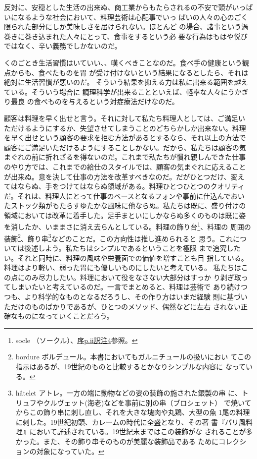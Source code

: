 反対に、安穏とした生活の出来ぬ、商工業からもたらされるの不安で頭がいっぱいになるような社会において、料理芸術は心配事でいっ
ぱいの人々の心のごく限られた部分にしか美味しさを届けられない。ほとんど
の場合、諸事という渦巻きに巻き込まれた人々にとって、食事をするという必
要な行為はもはや悦びではなく、辛い義務でしかないのだ。

くのごとき生活習慣はいていい、、嘆くべきことなのだ。食べ手の健康という観点からも、食べたものを胃
が受け付けないという結果になるとしたら、それは絶対に生活習慣が悪いのだ。
そういう結果を抑える力は私に出来る範囲を越えている。そういう場合に
調理科学が出来ることといえば、軽率な人々にうかぎり最良
の食べものを与えるという対症療法だけなのだ。

顧客は料理を早く出せと言う。それに対して私たち料理人としては、ご満足い
ただけるようにするか、失望させてしまうことのどちらかしか出来ない。料理
を早く出せという顧客の要求を拒む方法があるとするなら、それ以上の方法で
顧客にご満足いただけるようにすることしかない。だから、私たちは顧客の気
まぐれの前に折れざるを得ないのだ。これまで私たちが慣れ親しんできた仕事
のやり方では、これまでの給仕のスタイルでは、顧客の気まぐれに応えること
が出来ぬ。意を決して仕事の方法を改革すべきなのだ。だがひとつだけ、変え
てはならぬ、手をつけてはならぬ領域がある。料理ひとつひとつのクオリティ
だ。それは、料理人にとって仕事のベースとなるフォンや事前に仕込んでおい
たストック類がもたらすゆたかな風味に他ならぬ。私たちは既に、盛り付けの
領域においては改革に着手した。足手まといにしかならぬ多くのものは既に姿
を消したか、いままさに消え去らんとしている。料理の飾り台\footnote{socle
  （ソークル）、\protect\hyperlink{socle}{序p.ii訳注4}参照。}、料理の
周囲の装飾\footnote{bordure
  ボルデュール。本書においてもガルニチュールの扱いにおい
  てこの指示はあるが、19世紀のものと比較するとかなりシンプルな内容に
  なっている。}、飾り串\footnote{hâtelet
  アトレ。一方の端に動物などの姿の装飾の施された銀製の串
  に、トリュフやクルヴェット(海老)などを事前に別の串（ブロシェット）
  で焼いてからこの飾り串に刺し直し、それを大きな塊肉や丸鶏、大型の魚
  1尾の料理に刺した。19世紀初頭、カレームの時代に全盛となり、その著
  書『パリ風料理』において詳述されている。19世紀末まではこの装飾がな
  されることが多かった。また、その飾り串そのものが美麗な装飾品である
  ためにコレクションの対象になっていた。}などのことだ。この方向性は推し進められると
思う。これについては後述しよう。私たちはシンプルであるということを極限
まで追究したい。それと同時に、料理の風味や栄養面での価値を増すことも目
指している。料理はより軽い、弱った胃にも優しいものにしたいと考えている。
私たちはこの点にのみ尽力したい。料理において役をなさない大部分はすっか
り剥ぎ取ってしまいたいと考えているのだ。一言でまとめると、料理は芸術で
あり続けつつも、より科学的なものとなるだろうし、その作り方はいまだ経験
則に基づいただけのものばかりであるが、ひとつのメソッド、偶然などに左右
されない正確なものになっていくことだろう。


